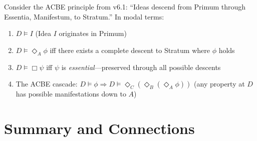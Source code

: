 \begin{example}
\label{ex:modal-acbe-reasoning}
Consider the ACBE principle from v6.1: ``Ideas descend from Primum through
Essentia, Manifestum, to Stratum.'' In modal terms:
\begin{enumerate}
  \item $D \vDash I$ (Idea $I$ originates in Primum)
  \item $D \vDash \Diamond_A \phi$ iff there exists a complete descent to Stratum
        where $\phi$ holds
  \item $D \vDash \Box \psi$ iff $\psi$ is \emph{essential}---preserved through
        all possible descents
  \item The ACBE cascade: $D \vDash \phi \Rightarrow D \vDash \Diamond_C(\Diamond_B(\Diamond_A \phi))$
        (any property at $D$ has possible manifestations down to $A$)
\end{enumerate}
\end{example}

\section{Summary and Connections}
\label{sec:indexed-fibered-summary}

